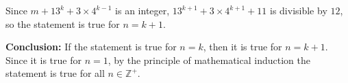 \documentclass[leqno]{article}
\begin{document}
\begin{enumerate}[
  label=\textbf{\arabic*.},
  leftmargin=*,
  topsep=0pt,
  partopsep=0pt,
  parsep=0pt
]
\begin{djsSolution}
Since \(m+13^k+3\times 4^{k-1}\) is an integer, \(13^{k+1}+3\times 4^{k+1}+11\) is divisible by \(12\), so the statement is true for \(n=k+1\).

\textbf{Conclusion:} If the statement is true for \(n=k\), then it is true for \(n=k+1\). Since it is true for \(n=1\), by the principle of mathematical induction the statement is true for all \(n\in\mathbb{Z}^+\).
\end{djsSolution}


\end{enumerate}
\end{document}
